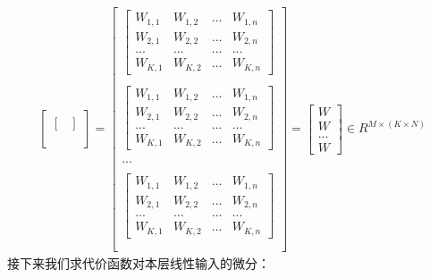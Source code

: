 \documentclass[UTF8]{article}
\begin{document}
\begin{equation}
\begin{aligned}
\begin{bmatrix}
\begin{bmatrix}
 \end{bmatrix} \\ \\
\end{bmatrix}
=\begin{bmatrix}
\begin{bmatrix}
 W_{1,1} & W_{1,2} & ... & W_{1,n} \\
 W_{2,1} & W_{2,2} & ... & W_{2,n} \\
 ... & ... & ... & ... \\
 W_{K,1} & W_{K,2} & ... & W_{K,n}
 \end{bmatrix} \\ \\
\begin{bmatrix}
 W_{1,1} & W_{1,2} & ... & W_{1,n} \\
 W_{2,1} & W_{2,2} & ... & W_{2,n} \\
 ... & ... & ... & ... \\
 W_{K,1} & W_{K,2} & ... & W_{K,n}
 \end{bmatrix} \\ \\
 ... \\ \\
 \begin{bmatrix}
 W_{1,1} & W_{1,2} & ... & W_{1,n} \\
 W_{2,1} & W_{2,2} & ... & W_{2,n} \\
 ... & ... & ... & ... \\
 W_{K,1} & W_{K,2} & ... & W_{K,n}
 \end{bmatrix} \\ \\
\end{bmatrix}=\begin{bmatrix}
W \\
W \\
... \\
W
\end{bmatrix} \in R^{M \times (K \times N)}
\end{aligned}
\label{mlp-pZ-pX-def}
\end{equation}
接下来我们求代价函数对本层线性输入的微分：
\end{document}
